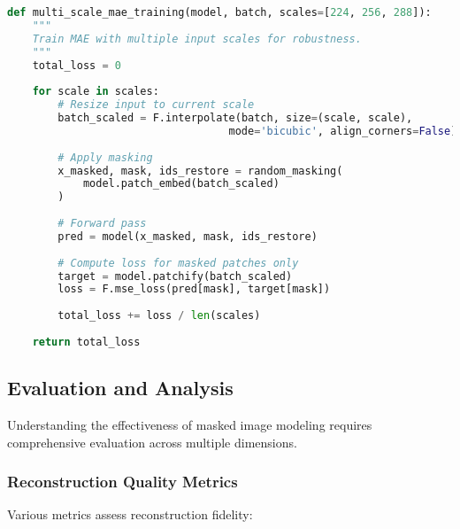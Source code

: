 \begin{lstlisting}[language=Python, caption=Multi-scale masked image modeling training]
def multi_scale_mae_training(model, batch, scales=[224, 256, 288]):
    """
    Train MAE with multiple input scales for robustness.
    """
    total_loss = 0
    
    for scale in scales:
        # Resize input to current scale
        batch_scaled = F.interpolate(batch, size=(scale, scale), 
                                   mode='bicubic', align_corners=False)
        
        # Apply masking
        x_masked, mask, ids_restore = random_masking(
            model.patch_embed(batch_scaled)
        )
        
        # Forward pass
        pred = model(x_masked, mask, ids_restore)
        
        # Compute loss for masked patches only
        target = model.patchify(batch_scaled)
        loss = F.mse_loss(pred[mask], target[mask])
        
        total_loss += loss / len(scales)
    
    return total_loss
\end{lstlisting}

\subsection{Evaluation and Analysis}

Understanding the effectiveness of masked image modeling requires comprehensive evaluation across multiple dimensions.

\subsubsection{Reconstruction Quality Metrics}

Various metrics assess reconstruction fidelity:

